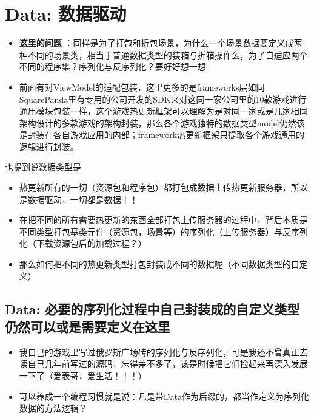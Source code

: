 \documentclass[9pt, b5paper]{article}
\begin{document}
\section{Data: 数据驱动}
\label{sec-2}
\begin{itemize}
\item \textbf{这里的问题} ：同样是为了打包和折包场景，为什么一个场景数据要定义成两种不同的场景类，相当于普通数据类型的装箱与折箱操作么，为了自适应两个不同的程序集？序列化与反序列化？要好好想一想
\item 前面有对ViewModel的适配包装，这里更多的是frameworks层如同SquarePanda里有专用的公司开发的SDK来对这同一家公司里的10款游戏进行通用模块包装一样，这个游戏热更新框架可以理解为是对同一家或是几家相同架构设计的多款游戏的架构封装，那么各个游戏独特的数据类型model仍然该是封装在各自游戏应用的内部；framework热更新框架只提取各个游戏通用的逻辑进行封装。
\end{itemize}
也提到说数据类型是
\begin{itemize}
\item 热更新所有的一切（资源包和程序包）都打包成数据上传热更新服务器，所以是数据驱动，一切都是数据！！
\item 在把不同的所有需要热更新的东西全部打包上传服务器的过程中，背后本质是不同类型打包基类元件（资源包，场景等）的序列化（上传服务器）与反序列化（下载资源包后的加载过程？）
\item 那么如何把不同的热更新类型打包封装成不同的数据呢（不同数据类型的自定义）　
\end{itemize}
\subsection{Data: 必要的序列化过程中自己封装成的自定义类型仍然可以或是需要定义在这里}
\label{sec-2-1}
\begin{itemize}
\item 我自己的游戏里写过俄罗斯广场砖的序列化与反序列化，可是我还不曾真正去读自己几年前写过的源码，忘得差不多了，该是时候把它们捡起来再深入发展一下了（爱表哥，爱生活！！！）
\item 可以养成一个编程习惯就是说：凡是带Data作为后缀的，都当作定义为序列化数据的方法逻辑？
\end{itemize}
\end{document}
